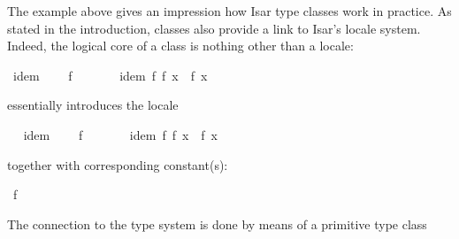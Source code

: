 \begin{isabellebody}
{}
\isamarkuptrue%
%
\isamarkuptrue%
%
\begin{isamarkuptext}%
The example above gives an impression how Isar type classes work
  in practice.  As stated in the introduction, classes also provide
  a link to Isar's locale system.  Indeed, the logical core of a class
  is nothing other than a locale:%
\end{isamarkuptext}%
\isamarkuptrue%
%
\isadelimquote
%
\endisadelimquote
%
\isatagquote
{}\isamarkupfalse%
\ idem\ {\isacharequal}\isanewline
\ \ \ f\ {\isacharcolon}{\isacharcolon}\ {\isachardoublequoteopen}{\isasymalpha}\ {\isasymRightarrow}\ {\isasymalpha}{\isachardoublequoteclose}\isanewline
\ \ \ idem{\isacharcolon}\ {\isachardoublequoteopen}f\ {\isacharparenleft}f\ x{\isacharparenright}\ {\isacharequal}\ f\ x{\isachardoublequoteclose}%
\endisatagquote
{\isafoldquote}%
%
\isadelimquote
%
\endisadelimquote
%
\begin{isamarkuptext}%
\noindent essentially introduces the locale%
\end{isamarkuptext}%
\isamarkuptrue%
\ %
\isadeliminvisible
%
\endisadeliminvisible
%
\isataginvisible
%
\endisataginvisible
{\isafoldinvisible}%
%
\isadeliminvisible
%
\endisadeliminvisible
%
\isadelimquote
%
\endisadelimquote
%
\isatagquote
{}\isamarkupfalse%
\ idem\ {\isacharequal}\isanewline
\ \ \ f\ {\isacharcolon}{\isacharcolon}\ {\isachardoublequoteopen}{\isasymalpha}\ {\isasymRightarrow}\ {\isasymalpha}{\isachardoublequoteclose}\isanewline
\ \ \ idem{\isacharcolon}\ {\isachardoublequoteopen}f\ {\isacharparenleft}f\ x{\isacharparenright}\ {\isacharequal}\ f\ x{\isachardoublequoteclose}%
\endisatagquote
{\isafoldquote}%
%
\isadelimquote
%
\endisadelimquote
%
\begin{isamarkuptext}%
\noindent together with corresponding constant(s):%
\end{isamarkuptext}%
\isamarkuptrue%
%
\isadelimquote
%
\endisadelimquote
%
\isatagquote
{}\isamarkupfalse%
\ f\ {\isacharcolon}{\isacharcolon}\ {\isachardoublequoteopen}{\isasymalpha}\ {\isasymRightarrow}\ {\isasymalpha}{\isachardoublequoteclose}%
\endisatagquote
{\isafoldquote}%
%
\isadelimquote
%
\endisadelimquote
%
\begin{isamarkuptext}%
\noindent The connection to the type system is done by means
  of a primitive type class%
\end{isamarkuptext}%
\isamarkuptrue%

\end{isabellebody}
